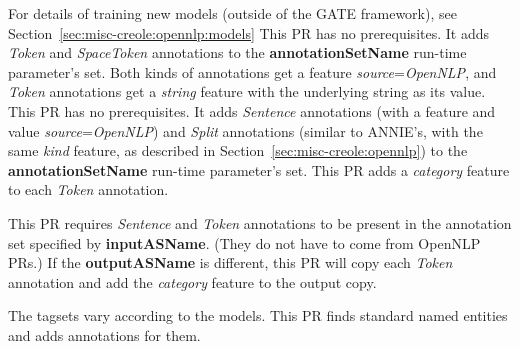 For details of training new models (outside of the GATE framework),
see Section~\ref{sec:misc-creole:opennlp:models}
This PR has no prerequisites.  It adds \emph{Token} and \emph{SpaceToken}
annotations to the \textbf{annotationSetName} run-time parameter's set.  Both
kinds of annotations get a feature \emph{source}=\emph{OpenNLP}, and
\emph{Token} annotations get a \emph{string} feature with the underlying string
as its value.
This PR has no prerequisites.  It adds \emph{Sentence} annotations (with a
feature and value \emph{source}=\emph{OpenNLP}) and \emph{Split} annotations
(similar to ANNIE's, with the same \emph{kind} feature, as described in
Section~\ref{sec:misc-creole:opennlp}) to the \textbf{annotationSetName}
run-time parameter's set.
This PR adds a \emph{category} feature to each \emph{Token} annotation.

This PR requires \emph{Sentence} and \emph{Token} annotations to be present in
the annotation set specified by \textbf{inputASName}.  (They do not have to come
from OpenNLP PRs.)  If the \textbf{outputASName} is different, this PR will copy
each \emph{Token} annotation and add the \emph{category} feature to the output
copy.

The tagsets vary according to the models.
This PR finds standard named entities and adds annotations for them.

